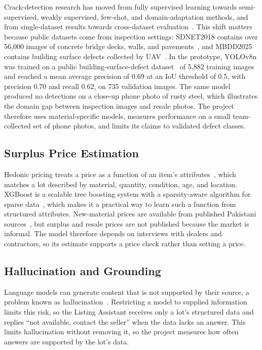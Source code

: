 Crack-detection research has moved from fully supervised learning towards
semi-supervised, weakly supervised, few-shot, and domain-adaptation methods, and from
single-dataset results towards cross-dataset evaluation~\citep{crackdetectionreview2025}.
This shift matters because public datasets come from inspection settings:
SDNET2018 contains over 56,000 images of concrete bridge decks, walls, and
pavements~\citep{sdnet2018}, and MBDD2025 contains building surface defects collected by
UAV~\citep{mbdd2025}. In the prototype, YOLOv8n was trained on a public building-surface-defect
dataset~\citep{buildingsurfacedefect} of 5,882 training images and reached a mean average
precision of 0.69 at an IoU threshold of 0.5, with precision 0.70 and recall 0.62, on 735
validation images. The same model produced no detections on a close-up phone photo of rusty
steel, which illustrates the domain gap between inspection images and resale photos. The
project therefore uses material-specific models, measures performance on a small
team-collected set of phone photos, and limits its claims to validated defect classes.

\subsection{Surplus Price Estimation}
Hedonic pricing treats a price as a function of an item's attributes~\citep{rosen1974hedonic},
which matches a lot described by material, quantity, condition, age, and location.
XGBoost is a scalable tree boosting system with a sparsity-aware algorithm for sparse
data~\citep{chen2016xgboost}, which makes it a practical way to learn such a function from
structured attributes. New-material prices are available from published Pakistani
sources~\citep{iconssteelrate,toolsfluentcost2026,thenewscosts2026,zameenprices,graanaprices},
but surplus and resale prices are not published because the market is informal. The model
therefore depends on interviews with dealers and contractors, so its estimate supports a
price check rather than setting a price.

\subsection{Hallucination and Grounding}
Language models can generate content that is not supported by their source, a problem
known as hallucination~\citep{ji2023hallucination}. Restricting a model to supplied
information limits this risk, so the Listing Assistant receives only a lot's structured data
and replies ``not available, contact the seller'' when the data lacks an answer. This limits
hallucination without removing it, so the project measures how often answers are
supported by the lot's data.


